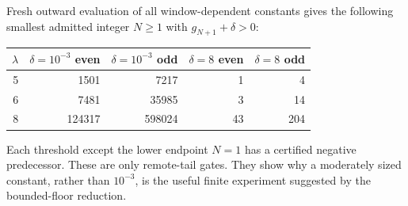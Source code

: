 \documentclass[11pt]{article}
\theoremstyle{remark}
\begin{document}
Fresh outward evaluation of all window-dependent constants gives the
following smallest admitted integer $N\ge1$ with $g_{N+1}+\delta>0$:
\begin{center}
\begin{tabular}{rrrrr}
\toprule
$\lambda$ & $\delta=10^{-3}$ even & $\delta=10^{-3}$ odd
 & $\delta=8$ even & $\delta=8$ odd\\
\midrule
5&1501&7217&1&4\\
6&7481&35985&3&14\\
8&124317&598024&43&204\\
\bottomrule
\end{tabular}
\end{center}
Each threshold except the lower endpoint $N=1$ has a certified
negative predecessor. These are only remote-tail gates. They show
why a moderately sized constant, rather than $10^{-3}$, is the useful
finite experiment suggested by the bounded-floor reduction.
\end{document}
